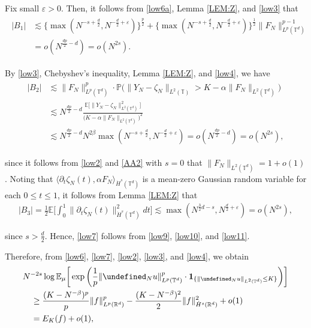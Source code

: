 \documentclass[letterpaper, 11pt,  reqno]{amsart}
\newcommand{\noi}{\noindent}
\newcommand{\R}{\mathbb{R}}
\newcommand{\T}{\mathbb{T}}
\let\P= \undefined
\newcommand{\P}{\mathbf{P}}
\newcommand{\E}{\mathbb{E}}
\newcommand{\be}{\beta}
\newcommand{\eps}{\varepsilon}
\newcommand{\dt}{\partial_t}
\newcommand{\les}{\lesssim}
\newcommand{\jb}[1]
{\langle #1 \rangle}
\newcommand{\ind}{\mathbf 1}
\numberwithin{equation}{section}
\numberwithin{theorem}{section}
\newcommand{\ze}{\zeta}
\newcommand{\PP}{\mathbb{P}}
\begin{document}
\noi
Fix  small $\eps > 0$.
Then, it follows from \eqref{low6a}, 
Lemma \ref{LEM:Z},  and 
\eqref{low3} that 
\begin{align}
\begin{split}
|B_1| & \lesssim 
\big\{\max (N^{- s + \frac{d}{2}}, N^{- \frac{d}{2}+\eps})\big\}^{\frac{p}{2}} 
+ \big\{\max (N^{- s + \frac{d}{2}}, N^{- \frac{d}{2}+\eps})\big\}^{\frac{1}{2}}
\| F_N \|^{p-1}_{L^{p}(\mathbb{T}^d)}  \\
&=o (N^{\frac {dp}2 - d}) = o (N^{2s}).
\end{split}
\label{low9}
\end{align}


\noi
 By \eqref{low3}, 
Chebyshev's inequality,  
Lemma \ref{LEM:Z}, and \eqref{low4}, we have 
\begin{align}
\begin{split}
|B_2| 
& \lesssim \| F_N \|^p_{L^p(\mathbb{T}^d)} \cdot
\PP \Big(
 \| Y_N - \ze_N \|_{L^2 (\mathbb{T})} > K - \alpha \| F_N \|_{L^2 (\mathbb{T}^d)} \Big)\\
& \les N^{\frac {dp}2 - d} \frac{\mathbb{E} \big[\|Y_N - \ze_N \|_{L^2 (\mathbb{T}^d)}^2\big]}
{\big(K - \alpha \| F_N \|_{L^2 (\mathbb{T}^d)} \big)^2}\\
& \les N^{\frac {dp}2 - d} N^{2\be} \max (N^{-s+\frac{d}{2}}, N^{-\frac{d}{2} +\eps})
= o (N^{\frac {dp}2 - d})
=o(N^{2s}), 
\end{split}
\label{low10}
\end{align}

\noi
 since 
it follows from \eqref{low2} and \eqref{AA2} with $s = 0$
that 
$\| F_N \|_{L^2 (\mathbb{T}^d)} = 1 + o(1)$.
Noting that  
$\jb{ \dt \ze_N(t), \alpha F_N }_{\dot H^{s}(\T^d)}$
is a mean-zero  Gaussian random variable for each $0 \le t \le 1$, 
it follows from 
Lemma \ref{LEM:Z}  that 
\begin{align}
|B_3|  =\frac{1}{2}\E\bigg[\int_{0}^1 
\|\dt \ze_N(t)\| ^2_{\dot H^s(\T^d)}dt \bigg]
\les 
\max
(N^{\frac{3 }{2}d - s}, N^{\frac{d}{2} +\eps })
= o (N^{2s}), 
\label{low11}
\end{align}

\noi
since $ s > \frac d2$.
Hence, \eqref{low7} follows
from \eqref{low9}, \eqref{low10}, and \eqref{low11}.



Therefore, 
from
 \eqref{low6}, \eqref{low7}, \eqref{low2}, \eqref{low3}, and \eqref{low4}, 
we obtain
\begin{align}
\begin{split}
& N^{-2s} 
 \log \E_{\mu}\bigg[ 
\exp\bigg( \frac 1 p \| \P_N u\|^p_{L^p(\T^d)} \cdot 
 \ind_{\{ \| \P_{N} u \|_{L^2 (\mathbb{T}^d)}\leq K \}}\bigg)\bigg]\\
& \quad 
\ge \frac{(K-N^{-\be})^p}{p}\|f\|^p_{L^p(\R^d)}-\frac{(K-N^{-\be})^2}{2}\|f\|^2_{\dot H^{s}(\R^d)}
+ o(1)\\
& \quad = E_K(f) + o(1), 
\end{split}
\label{low12}
\end{align}
\end{document}
